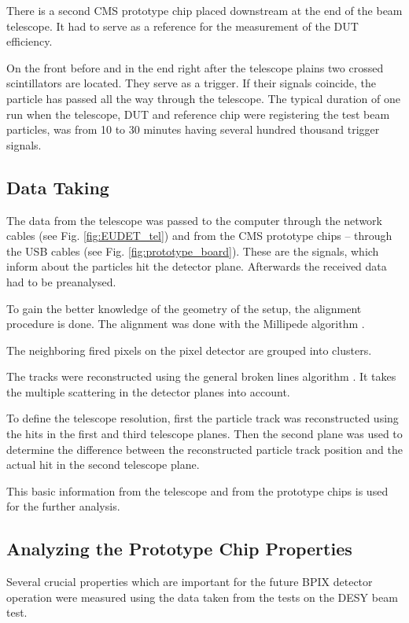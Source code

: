 There is a second CMS prototype chip placed downstream at the end of the beam telescope. It had to serve as a reference for the
measurement of the DUT efficiency.

On the front before and in the end right after the telescope plains two crossed scintillators are located. They serve as a trigger. 
If their signals coincide, the particle has passed all the way through the telescope.
The typical duration of one run when the telescope, DUT and reference chip were registering the test beam particles, was from 10
to 30 minutes having several hundred thousand trigger signals.

\subsection{Data Taking}

The data from the telescope was passed to the computer through the network cables (see Fig. \ref{fig:EUDET_tel}) and from
the CMS prototype chips -- through the USB cables (see Fig. \ref{fig:prototype_board}). These are the signals, which inform
about the particles hit the detector plane.  Afterwards the received data had to be preanalysed. 

To gain the better knowledge of the geometry of the setup, the alignment procedure is done. The alignment was done with the
Millipede algorithm \cite{1748-0221-3-09-P09002}.

The neighboring fired pixels on the pixel detector are grouped into clusters.

The tracks were reconstructed using the general broken lines algorithm \cite{Blobel:2006yi}. It takes the multiple scattering
in the detector planes into account. 

To define the telescope resolution, first the particle track was reconstructed using the hits in the first and third telescope planes.
Then the second plane was used to determine the difference between the reconstructed particle track position and the actual hit in the 
second telescope plane.

This basic information from the telescope and from the prototype chips is used for the further analysis.

\subsection{Analyzing the Prototype Chip Properties}

Several crucial properties which are important for the future BPIX detector operation were measured using the data taken from the 
tests on the DESY beam test.

